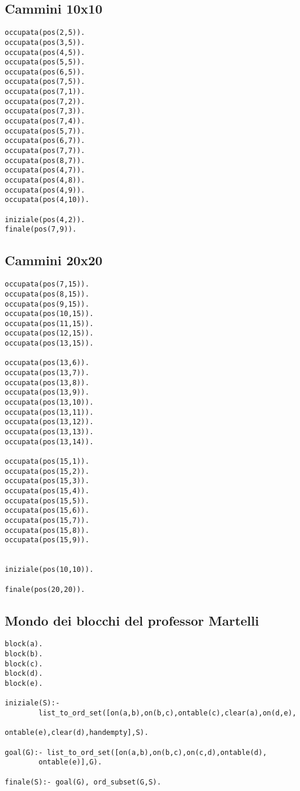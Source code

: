 \subsection{Cammini 10x10}

\begin{lstlisting}
occupata(pos(2,5)).
occupata(pos(3,5)).
occupata(pos(4,5)).
occupata(pos(5,5)).
occupata(pos(6,5)).
occupata(pos(7,5)).
occupata(pos(7,1)).
occupata(pos(7,2)).
occupata(pos(7,3)).
occupata(pos(7,4)).
occupata(pos(5,7)).
occupata(pos(6,7)).
occupata(pos(7,7)).
occupata(pos(8,7)).
occupata(pos(4,7)).
occupata(pos(4,8)).
occupata(pos(4,9)).
occupata(pos(4,10)).

iniziale(pos(4,2)).
finale(pos(7,9)).
\end{lstlisting}

\subsection{Cammini 20x20}

\begin{lstlisting}
occupata(pos(7,15)).
occupata(pos(8,15)).
occupata(pos(9,15)).
occupata(pos(10,15)).
occupata(pos(11,15)).
occupata(pos(12,15)).
occupata(pos(13,15)).

occupata(pos(13,6)).
occupata(pos(13,7)).
occupata(pos(13,8)).
occupata(pos(13,9)).
occupata(pos(13,10)).
occupata(pos(13,11)).
occupata(pos(13,12)).
occupata(pos(13,13)).
occupata(pos(13,14)).

occupata(pos(15,1)).
occupata(pos(15,2)).
occupata(pos(15,3)).
occupata(pos(15,4)).
occupata(pos(15,5)).
occupata(pos(15,6)).
occupata(pos(15,7)).
occupata(pos(15,8)).
occupata(pos(15,9)).


iniziale(pos(10,10)).

finale(pos(20,20)).
\end{lstlisting}

\subsection{Mondo dei blocchi del professor Martelli}

\begin{lstlisting}
block(a).
block(b).
block(c).
block(d).
block(e).

iniziale(S):-
        list_to_ord_set([on(a,b),on(b,c),ontable(c),clear(a),on(d,e),
                                                  ontable(e),clear(d),handempty],S).

goal(G):- list_to_ord_set([on(a,b),on(b,c),on(c,d),ontable(d),
        ontable(e)],G).

finale(S):- goal(G), ord_subset(G,S).
\end{lstlisting}


